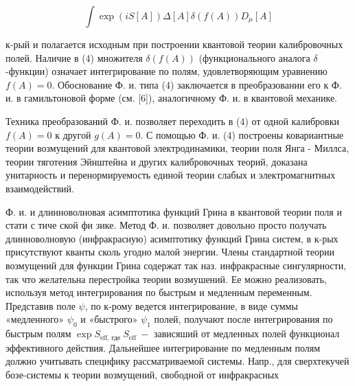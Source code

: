 \documentclass[10pt]{article}
\begin{document}
\[

\int \exp (i S[A]) \Delta[A] \delta(f(A)) D_{\mu}[A]

\]



к-рый и полагается исходным при построении квантовой теории калибровочных полей. Наличие в (4) множителя $\delta(f(A))$ (функционального аналога $\delta$-функции) означает интегрирование по полям, удовлетворяющим уравнению $f(A)=0$. Обоснование Ф. и. типа (4) заключается в преобразовании его к Ф. и. в гамильтоновой форме (см. [6]), аналогичному Ф. и. в квантовой механике.



Техника преобразований Ф. и. позволяет переходить в (4) от одной калибровки $f(A)=0$ к другой $g(A)=0$. С помощью Ф. и. (4) построены ковариантные теории возмущений для квантовой электродинамики, теории поля Янга - Миллса, теории тяготения Эйнштейна и других калибровочных теорий, доказана унитарность и перенормируемость единой теории слабых и электромагнитных взаимодействий.



Ф. и. и длинноволновая асимптотика функций Грина в квантовой теории поля и стати с тиче ской фи зике. Метод Ф. и. позволяет довольно просто получать длинноволновую (инфракрасную) асимптотику функций Грина систем, в к-рых присутствуют кванты сколь угодно малой энергии. Члены стандартной теории возмущений для функции Грина содержат так наз. инфракрасные сингулярности, так что желательна перестройка теории возмушений. Ее можно реализовать, используя метод интегрирования по быстрым и медленным переменным. Представив поле $\psi$, по к-рому ведется интегрирование, в виде суммы «медленного» $\psi_{0}$ и «быстрого» $\psi_{1}$ полей, получают после интегрирования по быстрым полям $\exp S_{\text {eff, где }} S_{\text {eff }}-$ зависяший от медленных полей функционал эффективного действия. Дальнейшее интегрирование по медленным полям должно учитывать специфику рассматриваемой системы. Напр., для сверхтекучей бозе-системы к теории возмущений, свободной от инфракрасных
\end{document}
